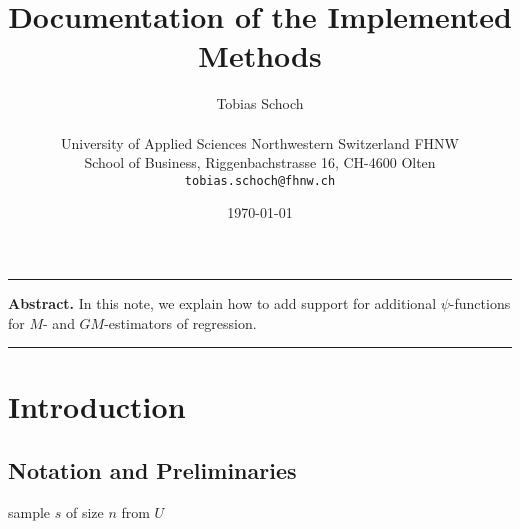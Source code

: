 \documentclass[a4paper,oneside,11pt,DIV=12]{scrartcl}
\theoremstyle{remark}
\begin{document}

\title{Documentation of the Implemented Methods}

\author{{\normalsize Tobias Schoch} \\
\begin{minipage}[t][][t]{\textwidth}
    \begin{center}
    \small{University of Applied Sciences Northwestern Switzerland FHNW} \\
    \small{School of Business, Riggenbachstrasse 16, CH-4600 Olten} \\
    \small{\texttt{tobias.schoch{@}fhnw.ch}}
    \end{center}
\end{minipage}}

\date{{\small \today}}
\maketitle

\renewenvironment{abstract}{%
\begin{center}\begin{minipage}{0.9\textwidth}
\rule{\textwidth}{0.4pt}
{\sffamily\bfseries\footnotesize Abstract.}\small}
{\par\noindent\rule{\textwidth}{0.4pt}\end{minipage}\end{center}}

\begin{abstract}
In this note, we explain how to add support for additional $\psi$-functions
for $M$- and $GM$-estimators of regression.
\end{abstract}

\vspace{1em}


\section{Introduction}\label{sec:introduction}


\subsection{Notation and Preliminaries}
sample $s$ of size $n$ from $U$
\end{document}
